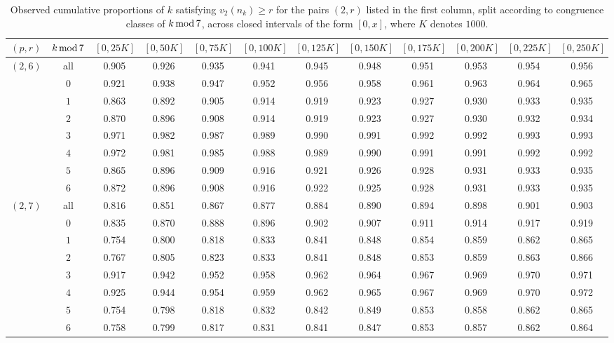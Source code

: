 \documentclass[12pt]{amsart}%
\renewcommand{\pmod}[1]{\hspace{0.05em}(\mathrm{mod}\,#1)}
\newcommand{\1}{\mathds{1}}
\renewcommand{\pmod}[1]{\,{\rm mod}\,#1}
\theoremstyle{definition}
\numberwithin{equation}{section}
\numberwithin{table}{section}
\numberwithin{figure}{section}
\begin{document}
\begin{table}[htbp]
\centering
\scriptsize
\begin{tabular}{@{}cc|cccccccccc@{}}
$(p,r)$ & $k\pmod 7$ & $[0,25K]$ & $[0,50K]$ & $[0,75K]$ & $[0,100K]$ & $[0,125K]$ & $[0,150K]$ & $[0,175K]$ & $[0,200K]$ & $[0,225K]$ & $[0,250K]$ \\
\hline
$(2,6)$ & all & 0.905 & 0.926 & 0.935 & 0.941 & 0.945 & 0.948 & 0.951 & 0.953 & 0.954 & 0.956 \\
 & $0$ & 0.921 & 0.938 & 0.947 & 0.952 & 0.956 & 0.958 & 0.961 & 0.963 & 0.964 & 0.965 \\
 & $1$ & 0.863 & 0.892 & 0.905 & 0.914 & 0.919 & 0.923 & 0.927 & 0.930 & 0.933 & 0.935 \\
 & $2$ & 0.870 & 0.896 & 0.908 & 0.914 & 0.919 & 0.923 & 0.927 & 0.930 & 0.932 & 0.934 \\
 & $3$ & 0.971 & 0.982 & 0.987 & 0.989 & 0.990 & 0.991 & 0.992 & 0.992 & 0.993 & 0.993 \\
 & $4$ & 0.972 & 0.981 & 0.985 & 0.988 & 0.989 & 0.990 & 0.991 & 0.991 & 0.992 & 0.992 \\
 & $5$ & 0.865 & 0.896 & 0.909 & 0.916 & 0.921 & 0.926 & 0.928 & 0.931 & 0.933 & 0.935 \\
 & $6$ & 0.872 & 0.896 & 0.908 & 0.916 & 0.922 & 0.925 & 0.928 & 0.931 & 0.933 & 0.935 \\
\hline
$(2,7)$ & all & 0.816 & 0.851 & 0.867 & 0.877 & 0.884 & 0.890 & 0.894 & 0.898 & 0.901 & 0.903 \\
 & $0$ & 0.835 & 0.870 & 0.888 & 0.896 & 0.902 & 0.907 & 0.911 & 0.914 & 0.917 & 0.919 \\
 & $1$ & 0.754 & 0.800 & 0.818 & 0.833 & 0.841 & 0.848 & 0.854 & 0.859 & 0.862 & 0.865 \\
 & $2$ & 0.767 & 0.805 & 0.823 & 0.833 & 0.841 & 0.848 & 0.853 & 0.859 & 0.863 & 0.866 \\
 & $3$ & 0.917 & 0.942 & 0.952 & 0.958 & 0.962 & 0.964 & 0.967 & 0.969 & 0.970 & 0.971 \\
 & $4$ & 0.925 & 0.944 & 0.954 & 0.959 & 0.962 & 0.965 & 0.967 & 0.969 & 0.970 & 0.972 \\
 & $5$ & 0.754 & 0.798 & 0.818 & 0.832 & 0.842 & 0.849 & 0.853 & 0.858 & 0.862 & 0.865 \\
 & $6$ & 0.758 & 0.799 & 0.817 & 0.831 & 0.841 & 0.847 & 0.853 & 0.857 & 0.862 & 0.864 \\
\hline
\end{tabular}
\caption{Observed cumulative proportions of $k$ satisfying $v_2(n_k)\ge r$ for the pairs $(2,r)$ listed in the first column, split according to congruence classes of $k \pmod 7$, across closed intervals of the form $[0,x]$, where $K$ denotes $1000$.
\label{tab:v2_geq_mod7_statistics_congruence_cumulative}}
\end{table}
\end{document}
